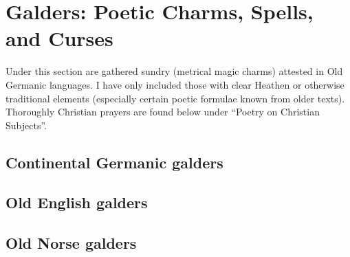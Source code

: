 \part{Galders: Poetic Charms, Spells, and Curses}

Under this section are gathered sundry  (metrical magic charms) attested in Old Germanic languages.  I have only included those with clear Heathen or otherwise traditional elements (especially certain poetic formulae known from older texts).  Thoroughly Christian prayers are found below under “Poetry on Christian Subjects”.


\chapter{Continental Germanic galders}





\chapter{Old English galders}







\chapter{Old Norse galders}








